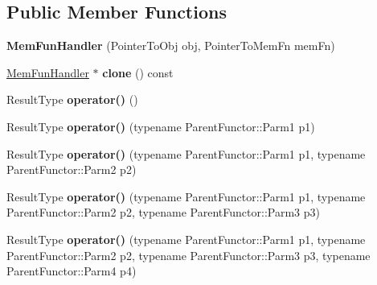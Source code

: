 \subsection*{Public Member Functions}
\begin{DoxyCompactItemize}
\item 
\hypertarget{classutilspp_1_1MemFunHandler_aea7089310e1d76f837544b8e5d066331}{{\bfseries Mem\-Fun\-Handler} (Pointer\-To\-Obj obj, Pointer\-To\-Mem\-Fn mem\-Fn)}\label{classutilspp_1_1MemFunHandler_aea7089310e1d76f837544b8e5d066331}

\item 
\hypertarget{classutilspp_1_1MemFunHandler_a9d367b1cbb9e559def919f980caee9c5}{\hyperlink{classutilspp_1_1MemFunHandler}{Mem\-Fun\-Handler} $\ast$ {\bfseries clone} () const }\label{classutilspp_1_1MemFunHandler_a9d367b1cbb9e559def919f980caee9c5}

\item 
\hypertarget{classutilspp_1_1MemFunHandler_ab78f0cd858d3b59356629cbb97aa519e}{Result\-Type {\bfseries operator()} ()}\label{classutilspp_1_1MemFunHandler_ab78f0cd858d3b59356629cbb97aa519e}

\item 
\hypertarget{classutilspp_1_1MemFunHandler_a5c24fcf65e36991e668dd2a95560e7e2}{Result\-Type {\bfseries operator()} (typename Parent\-Functor\-::\-Parm1 p1)}\label{classutilspp_1_1MemFunHandler_a5c24fcf65e36991e668dd2a95560e7e2}

\item 
\hypertarget{classutilspp_1_1MemFunHandler_a16f93069d60fe6ad1477a8cd1ad0a11d}{Result\-Type {\bfseries operator()} (typename Parent\-Functor\-::\-Parm1 p1, typename Parent\-Functor\-::\-Parm2 p2)}\label{classutilspp_1_1MemFunHandler_a16f93069d60fe6ad1477a8cd1ad0a11d}

\item 
\hypertarget{classutilspp_1_1MemFunHandler_a8d0ddaec8227b41f4546a3c1e3e2de48}{Result\-Type {\bfseries operator()} (typename Parent\-Functor\-::\-Parm1 p1, typename Parent\-Functor\-::\-Parm2 p2, typename Parent\-Functor\-::\-Parm3 p3)}\label{classutilspp_1_1MemFunHandler_a8d0ddaec8227b41f4546a3c1e3e2de48}

\item 
\hypertarget{classutilspp_1_1MemFunHandler_a9be691752cca0347a0eb862793498fd3}{Result\-Type {\bfseries operator()} (typename Parent\-Functor\-::\-Parm1 p1, typename Parent\-Functor\-::\-Parm2 p2, typename Parent\-Functor\-::\-Parm3 p3, typename Parent\-Functor\-::\-Parm4 p4)}\label{classutilspp_1_1MemFunHandler_a9be691752cca0347a0eb862793498fd3}


\end{DoxyCompactItemize}
